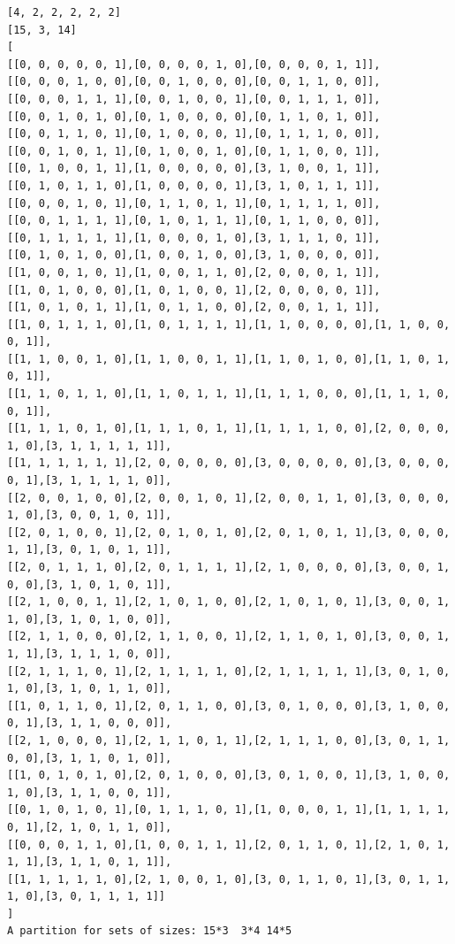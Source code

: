 \documentclass[final]{dmtcs-episciences}
\begin{document}
\begin{appendices}
\begin{verbatim} 
[4, 2, 2, 2, 2, 2]
[15, 3, 14]
[
[[0, 0, 0, 0, 0, 1],[0, 0, 0, 0, 1, 0],[0, 0, 0, 0, 1, 1]],
[[0, 0, 0, 1, 0, 0],[0, 0, 1, 0, 0, 0],[0, 0, 1, 1, 0, 0]],
[[0, 0, 0, 1, 1, 1],[0, 0, 1, 0, 0, 1],[0, 0, 1, 1, 1, 0]],
[[0, 0, 1, 0, 1, 0],[0, 1, 0, 0, 0, 0],[0, 1, 1, 0, 1, 0]],
[[0, 0, 1, 1, 0, 1],[0, 1, 0, 0, 0, 1],[0, 1, 1, 1, 0, 0]],
[[0, 0, 1, 0, 1, 1],[0, 1, 0, 0, 1, 0],[0, 1, 1, 0, 0, 1]],
[[0, 1, 0, 0, 1, 1],[1, 0, 0, 0, 0, 0],[3, 1, 0, 0, 1, 1]],
[[0, 1, 0, 1, 1, 0],[1, 0, 0, 0, 0, 1],[3, 1, 0, 1, 1, 1]],
[[0, 0, 0, 1, 0, 1],[0, 1, 1, 0, 1, 1],[0, 1, 1, 1, 1, 0]],
[[0, 0, 1, 1, 1, 1],[0, 1, 0, 1, 1, 1],[0, 1, 1, 0, 0, 0]],
[[0, 1, 1, 1, 1, 1],[1, 0, 0, 0, 1, 0],[3, 1, 1, 1, 0, 1]],
[[0, 1, 0, 1, 0, 0],[1, 0, 0, 1, 0, 0],[3, 1, 0, 0, 0, 0]],
[[1, 0, 0, 1, 0, 1],[1, 0, 0, 1, 1, 0],[2, 0, 0, 0, 1, 1]],
[[1, 0, 1, 0, 0, 0],[1, 0, 1, 0, 0, 1],[2, 0, 0, 0, 0, 1]],
[[1, 0, 1, 0, 1, 1],[1, 0, 1, 1, 0, 0],[2, 0, 0, 1, 1, 1]],
[[1, 0, 1, 1, 1, 0],[1, 0, 1, 1, 1, 1],[1, 1, 0, 0, 0, 0],[1, 1, 0, 0, 0, 1]],
[[1, 1, 0, 0, 1, 0],[1, 1, 0, 0, 1, 1],[1, 1, 0, 1, 0, 0],[1, 1, 0, 1, 0, 1]],
[[1, 1, 0, 1, 1, 0],[1, 1, 0, 1, 1, 1],[1, 1, 1, 0, 0, 0],[1, 1, 1, 0, 0, 1]],
[[1, 1, 1, 0, 1, 0],[1, 1, 1, 0, 1, 1],[1, 1, 1, 1, 0, 0],[2, 0, 0, 0, 1, 0],[3, 1, 1, 1, 1, 1]],
[[1, 1, 1, 1, 1, 1],[2, 0, 0, 0, 0, 0],[3, 0, 0, 0, 0, 0],[3, 0, 0, 0, 0, 1],[3, 1, 1, 1, 1, 0]],
[[2, 0, 0, 1, 0, 0],[2, 0, 0, 1, 0, 1],[2, 0, 0, 1, 1, 0],[3, 0, 0, 0, 1, 0],[3, 0, 0, 1, 0, 1]],
[[2, 0, 1, 0, 0, 1],[2, 0, 1, 0, 1, 0],[2, 0, 1, 0, 1, 1],[3, 0, 0, 0, 1, 1],[3, 0, 1, 0, 1, 1]],
[[2, 0, 1, 1, 1, 0],[2, 0, 1, 1, 1, 1],[2, 1, 0, 0, 0, 0],[3, 0, 0, 1, 0, 0],[3, 1, 0, 1, 0, 1]],
[[2, 1, 0, 0, 1, 1],[2, 1, 0, 1, 0, 0],[2, 1, 0, 1, 0, 1],[3, 0, 0, 1, 1, 0],[3, 1, 0, 1, 0, 0]],
[[2, 1, 1, 0, 0, 0],[2, 1, 1, 0, 0, 1],[2, 1, 1, 0, 1, 0],[3, 0, 0, 1, 1, 1],[3, 1, 1, 1, 0, 0]],
[[2, 1, 1, 1, 0, 1],[2, 1, 1, 1, 1, 0],[2, 1, 1, 1, 1, 1],[3, 0, 1, 0, 1, 0],[3, 1, 0, 1, 1, 0]],
[[1, 0, 1, 1, 0, 1],[2, 0, 1, 1, 0, 0],[3, 0, 1, 0, 0, 0],[3, 1, 0, 0, 0, 1],[3, 1, 1, 0, 0, 0]],
[[2, 1, 0, 0, 0, 1],[2, 1, 1, 0, 1, 1],[2, 1, 1, 1, 0, 0],[3, 0, 1, 1, 0, 0],[3, 1, 1, 0, 1, 0]],
[[1, 0, 1, 0, 1, 0],[2, 0, 1, 0, 0, 0],[3, 0, 1, 0, 0, 1],[3, 1, 0, 0, 1, 0],[3, 1, 1, 0, 0, 1]],
[[0, 1, 0, 1, 0, 1],[0, 1, 1, 1, 0, 1],[1, 0, 0, 0, 1, 1],[1, 1, 1, 1, 0, 1],[2, 1, 0, 1, 1, 0]],
[[0, 0, 0, 1, 1, 0],[1, 0, 0, 1, 1, 1],[2, 0, 1, 1, 0, 1],[2, 1, 0, 1, 1, 1],[3, 1, 1, 0, 1, 1]],
[[1, 1, 1, 1, 1, 0],[2, 1, 0, 0, 1, 0],[3, 0, 1, 1, 0, 1],[3, 0, 1, 1, 1, 0],[3, 0, 1, 1, 1, 1]]
]
A partition for sets of sizes: 15*3  3*4 14*5
\end{verbatim}
\newpage


\end{appendices}
\end{document}
